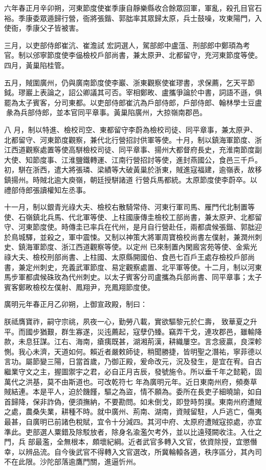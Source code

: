 \begin{pinyinscope}
 六年春正月辛卯朔，河東節度使崔季康自靜樂縣收合餘眾回軍，軍亂，殺孔目官石裕。季康委眾遁歸行營，衙將張鍇、郭朏率其眾歸太原，兵士鼓噪，攻東陽門，入使衙，季康父子皆被害。



 三月，以吏部侍郎崔沆、崔澹試
 宏詞選人，駕部郎中盧蕰、刑部郎中鄭頊為考官。制以邠寧節度使李偘檢校戶部尚書，兼太原尹、北都留守，充河東節度等使。四月，黃巢陷桂管。



 五月，賊圍廣州，仍與廣南節度使李巖、浙東觀察使崔璆書，求保薦，乞天平節鉞。璆巖上表論之，詔公卿議其可否。宰相鄭畋、盧攜爭論於中書，詞語不遜，俱罷為太子賓客，分司東都。以吏部侍郎崔沆為戶部侍郎，戶部侍郎、翰林學士豆盧彖為兵部侍郎，並本官同平章事。黃巢陷廣州，大掠嶺南郡邑。



 八
 月，制以特進、檢校司空、東都留守李蔚為檢校司徒、同平章事，兼太原尹、北都留守、河東節度觀察，兼代北行營招討供軍等使。十月，制以鎮海軍節度、浙江西道觀察處置等使高駢檢校司徒、同平章事、揚州大都督府長史，充淮南節度副大使、知節度事、江淮鹽鐵轉運、江南行營招討等使，進封燕國公，食邑三千戶。初，駢在浙西，遣大將張璘、梁績等大破黃巢於浙東，賊進寇福建，逾嶺表，故移鎮揚州。時賊北逾大庾嶺，朝廷授駢諸道
 行營兵馬都統。太原節度使李蔚卒。以禮部侍郎張讀權知左丞事。



 十一月，制以銀青光祿大夫、檢校右散騎常侍、河東行軍司馬、雁門代北制置等使、石嶺鎮北兵馬、代北軍等使、上柱國康傳圭檢校工部尚書，兼太原尹、北都留守、河東節度使。時傳圭已率兵在代州，是月自行營赴任，兩都虞候張鍇、郭朏迎於鳥城驛，並殺之，軍中震悚。又制以神策大將軍周寶檢校尚書左僕射，兼潤州刺史、鎮海軍節度、浙江西道觀察等使。以定州
 已來制置內閑廄宮苑等使、金紫光祿大夫、檢校刑部尚書、上柱國、太原縣開國伯、食邑七百戶王處存檢校戶部尚書，兼定州刺史，充義武軍節度、易定觀察處置、北平軍等使。十二月，制以河東馬步軍都虞候硃玫為代州刺史。以太子賓客分司盧攜為兵部尚書、同平章事；太子賓客鄭畋檢校左僕射、鳳翔尹，充鳳翔節度使。



 廣明元年春正月乙卯朔，上御宣政殿，制曰：



 朕祗膺寶祚，嗣守宗祧，夙夜一心，勤勞八載，實欲驅黎元於仁壽，
 致華夏之升平。而國步猶艱，群生寡遂，災迍薦起，寇孽仍臻。竊弄干戈，連攻郡邑，雖輸降款，未息狂謀。江右、海南，瘡痍既甚，湖湘荊漢，耕織屢空。言念疲贏，良深軫惻。我心未濟，天道如何。賴近者嚴敕師徒，稍聞勝捷，皆明聖之潛祐，寧菲德以言功。屬節變三陽，日當首歲，乃御正殿，爰命改元，況及發生，是宜在宥。自古繼業守文之主，握圖禦宇之君，必自正月吉辰，發號施令。所以垂千年之懿範，固萬代之洪基，莫不由斯道也。可改乾符七
 年為廣明元年。近日東南州府，頻奏草賊結連。本是平人，迫於饑饉，驅之為盜，情不願為。委所在長吏子細曉諭，如自首歸降，保非詐偽，便須撫納，不要勘問。如未倒戈，即登時剪撲。東南州府遭賊之處，農桑失業，耕種不時。就中廣州、荊南、湖南，資賊留駐，人戶逃亡，傷夷最甚，自廣明已前諸色稅賦，宜令十分減四。其河中府、太原府遭賊寇掠處，亦宜準此。吏部選人粟錯及除駁放者，除身名渝濫欠考外，並以比遠殘闕收注。入仕之門，兵
 部最濫，全無根本，頗壞紀綱。近者武官多轉入文官，依資除授，宜懲僭幸，以辨品流。自今後武官不得轉入文官選改，所冀輪轅各適，秩序區分，其內司不在此限。沙陀部落逾鷹門關，進逼忻州。




\end{pinyinscope}
